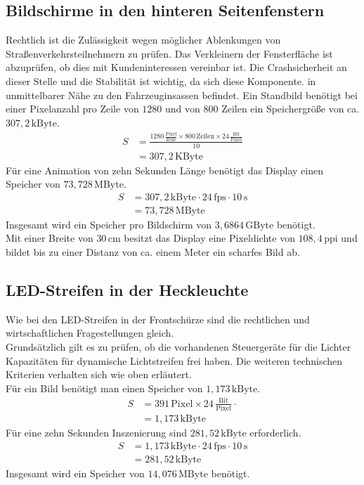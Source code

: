\subsection{Bildschirme in den hinteren Seitenfenstern}
Rechtlich ist die Zulässigkeit wegen möglicher Ablenkungen von Straßenverkehrsteilnehmern zu prüfen.
Das Verkleinern der Fensterfläche ist abzuprüfen, ob dies mit Kundeninteressen vereinbar ist.
Die Crashsicherheit an dieser Stelle und die Stabilität ist wichtig, da sich diese Komponente. in unmittelbarer Nähe zu den Fahrzeuginsassen befindet.
Ein Standbild benötigt bei einer Pixelanzahl pro Zeile von $ 1280 $ und von $ 800 $ Zeilen ein Speichergröße von ca. $ 307,2\,\mathrm{kByte}$. 
\begin{align}
	S &= \frac{1280\,\frac{\mathrm{Pixel}}{\mathrm{Zeile}}\times 800\,\mathrm{Zeilen} \times 24\,\frac{\mathrm{Bit}}{\mathrm{Pixel}}}{10} \\
	&= 307,2\,\mathrm{KByte}
\end{align}
Für eine Animation von zehn Sekunden Länge benötigt das Display einen Speicher von $ 73,728\,\mathrm{MByte}$.
\begin{align}
	S &= 307,2\,\mathrm{kByte} \cdot 24\,\mathrm{fps} \cdot 10\,\mathrm{s}\\
	&= 73,728\,\mathrm{MByte}
\end{align}
Insgesamt wird ein Speicher pro Bildschirm von $ 3,6864\,\mathrm{GByte} $ benötigt. \\
Mit einer Breite von $ 30\,\mathrm{cm} $ besitzt das Display eine Pixeldichte von $ 108,4\,\mathrm{ppi} $ und bildet bis zu einer Distanz von ca. einem Meter ein scharfes Bild ab.
\subsection{LED-Streifen in der Heckleuchte}
Wie bei den LED-Streifen in der Frontschürze sind die rechtlichen und wirtschaftlichen Fragestellungen gleich. \\
Grundsätzlich gilt es zu prüfen, ob die vorhandenen Steuergeräte für die Lichter Kapazitäten für dynamische Lichtstreifen frei haben.
Die weiteren technischen Kriterien verhalten sich wie oben erläutert. \\
Für ein Bild benötigt man einen Speicher von $ 1,173\,\mathrm{kByte} $.
\begin{align}
	S &= 391\,\mathrm{Pixel} \times 24\,\frac{\mathrm{Bit}}{\mathrm{Pixel}} \cdot \\
	&= 1,173\,\mathrm{kByte}
\end{align}
Für eine zehn Sekunden Inszenierung sind $ 281,52\,\mathrm{kByte} $ erforderlich.
\begin{align}
	S &= 1,173\,\mathrm{kByte} \cdot 24\,\mathrm{fps} \cdot 10\,\mathrm{s} \\
	&= 281,52\,\mathrm{kByte}
\end{align}
Insgesamt wird ein Speicher von $ 14,076\,\mathrm{MByte} $ benötigt.
